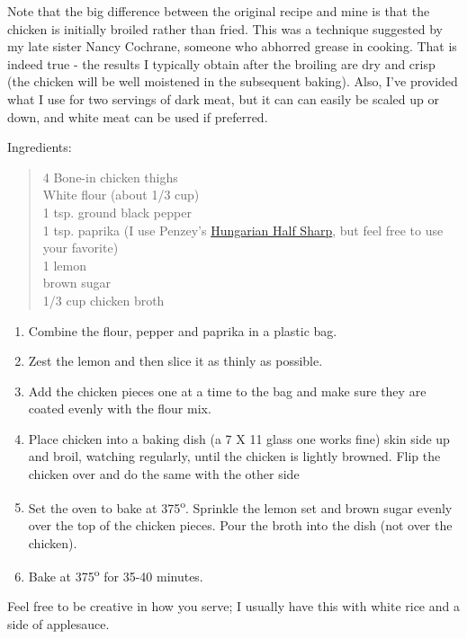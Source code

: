 \documentclass[
]{book}
\providecommand{\tightlist}{%
  \setlength{\itemsep}{0pt}\setlength{\parskip}{0pt}}
\begin{document}
Note that the big difference between the original recipe and mine is that the chicken is initially broiled rather than fried. This was a technique suggested by my late sister Nancy Cochrane, someone who abhorred grease in cooking. That is indeed true - the results I typically obtain after the broiling are dry and crisp (the chicken will be well moistened in the subsequent baking). Also, I've provided what I use for two servings of dark meat, but it can can easily be scaled up or down, and white meat can be used if preferred.

Ingredients:

\begin{quote}
4 Bone-in chicken thighs\\
White flour (about 1/3 cup)\\
1 tsp. ground black pepper\\
1 tsp. paprika (I use Penzey's \href{https://www.penzeys.com/online-catalog/hungarian-style-half-sharp-paprika/c-24/p-1147/pd-s}{Hungarian Half Sharp}, but feel free to use your favorite)\\
1 lemon\\
brown sugar\\
1/3 cup chicken broth
\end{quote}

\begin{enumerate}
\def\labelenumi{\arabic{enumi}.}
\tightlist
\item
  Combine the flour, pepper and paprika in a plastic bag.
\item
  Zest the lemon and then slice it as thinly as possible.\\
\item
  Add the chicken pieces one at a time to the bag and make sure they are coated evenly with the flour mix.
\item
  Place chicken into a baking dish (a 7 X 11 glass one works fine) skin side up and broil, watching regularly, until the chicken is lightly browned. Flip the chicken over and do the same with the other side
\item
  Set the oven to bake at 375\textsuperscript{o}. Sprinkle the lemon set and brown sugar evenly over the top of the chicken pieces. Pour the broth into the dish (not over the chicken).
\item
  Bake at 375\textsuperscript{o} for 35-40 minutes.
\end{enumerate}

Feel free to be creative in how you serve; I usually have this with white rice and a side of applesauce.
\end{document}
